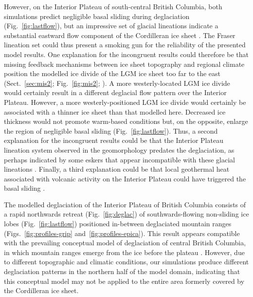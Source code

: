 \documentclass[tc]{copernicus}
\begin{document}
However, on the Interior Plateau of south-central British Columbia, both
simulations predict negligible basal sliding during deglaciation
(Fig.~\ref{fig:lastflow}), but an impressive set of glacial lineations
indicate a substantial eastward flow component of the Cordilleran ice sheet
\citep{Prest.etal.1968, Kleman.etal.2010}.
The Fraser lineation set could thus present a smoking gun for the
reliability of the presented model results. One explanation for the incongruent
results could therefore be that missing feedback mechanisms between ice sheet
topography and regional climate position the modelled ice divide of the LGM ice
sheet too far to the east (Sect.~\ref{sec:mis2}; Fig.~\ref{fig:mis2};
\citealp{Seguinot.etal.2014}). A more westerly-located LGM ice divide would
certainly result in a different deglacial flow pattern over the Interior
Plateau. However, a more westerly-positioned LGM ice divide would certainly be
associated with a thinner ice sheet than that modelled here. Decreased ice
thickness would not promote warm-based conditions but, on the
opposite, enlarge the region of negligible basal sliding
(Fig.~\ref{fig:lastflow}). Thus, a second explanation for the incongruent
results could be that the Interior Plateau lineation system observed in the
geomorphology predates the deglaciation, as perhaps indicated by some eskers
that appear incompatible with these glacial lineations
\citep[Fig.~9]{Margold.etal.2013a}. Finally, a third explanation could be that
local geothermal heat associated with volcanic activity on the Interior Plateau
could have triggered the basal sliding
\citep[cf. Greenland ice sheet,][]{Fahnestock.etal.2001}.

The modelled deglaciation of the Interior Plateau of British Columbia
consists of a rapid northwards retreat (Fig.~\ref{fig:deglac}) of
southwards-flowing non-sliding ice lobes (Fig.~\ref{fig:lastflow}) positioned
in-between deglaciated mountain ranges
(Figs.~\ref{fig:profiles-grip} and~\ref{fig:profiles-epica}). This result
appears compatible with the prevailing conceptual model of deglaciation of
central British Columbia, in which mountain ranges emerge from the ice before
the plateau \citep[Fig.~7]{Fulton.1991}. However, due to different topographic
and climatic conditions, our simulations produce different deglaciation
patterns in the northern half of the model domain, indicating that this
conceptual model may not be applied to the entire area formerly covered by the
Cordilleran ice sheet.


\conclusions
\label{sec:concl}
\end{document}
